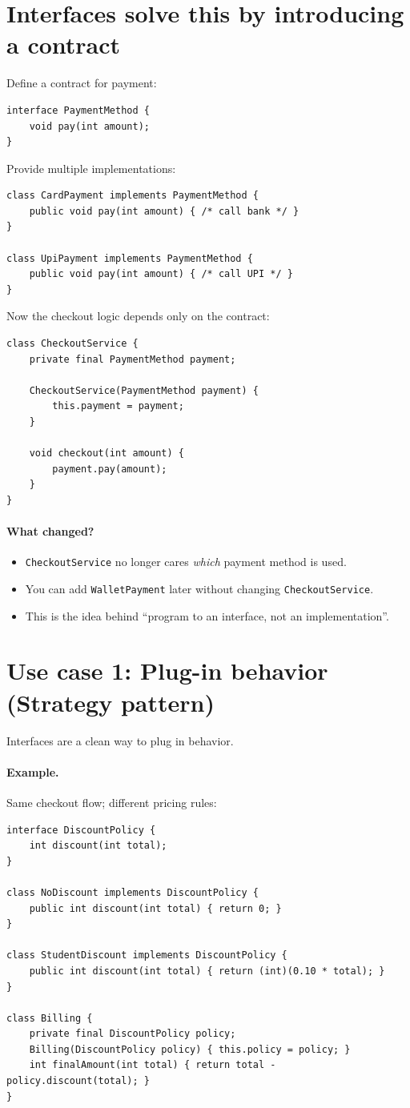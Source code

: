 \documentclass[11pt]{article}
\begin{document}
\section*{Interfaces solve this by introducing a contract}
Define a contract for payment:
\begin{lstlisting}
interface PaymentMethod {
    void pay(int amount);
}
\end{lstlisting}

Provide multiple implementations:
\begin{lstlisting}
class CardPayment implements PaymentMethod {
    public void pay(int amount) { /* call bank */ }
}

class UpiPayment implements PaymentMethod {
    public void pay(int amount) { /* call UPI */ }
}
\end{lstlisting}

Now the checkout logic depends only on the contract:
\begin{lstlisting}
class CheckoutService {
    private final PaymentMethod payment;

    CheckoutService(PaymentMethod payment) {
        this.payment = payment;
    }

    void checkout(int amount) {
        payment.pay(amount);
    }
}
\end{lstlisting}

\paragraph{What changed?}
\begin{itemize}
  \item \texttt{CheckoutService} no longer cares \textit{which} payment method is used.
  \item You can add \texttt{WalletPayment} later without changing \texttt{CheckoutService}.
  \item This is the idea behind ``program to an interface, not an implementation''.
\end{itemize}

\section*{Use case 1: Plug-in behavior (Strategy pattern)}
Interfaces are a clean way to plug in behavior.

\paragraph{Example.} Same checkout flow; different pricing rules:
\begin{lstlisting}
interface DiscountPolicy {
    int discount(int total);
}

class NoDiscount implements DiscountPolicy {
    public int discount(int total) { return 0; }
}

class StudentDiscount implements DiscountPolicy {
    public int discount(int total) { return (int)(0.10 * total); }
}

class Billing {
    private final DiscountPolicy policy;
    Billing(DiscountPolicy policy) { this.policy = policy; }
    int finalAmount(int total) { return total - policy.discount(total); }
}
\end{lstlisting}
\end{document}
